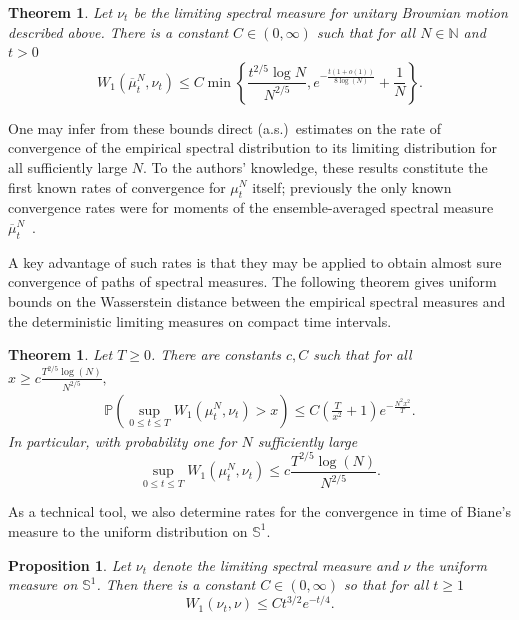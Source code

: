 \documentclass[11pt]{article}
\newtheorem{thm}[theo]{Theorem}
\newtheorem{prop}[theo]{Proposition}
\theoremstyle{definition}
\numberwithin{equation}{section}
\numberwithin{figure}{section}
\numberwithin{table}{section}
\newcommand{\Prob}{\mathbb{P}}
\begin{document}
\begin{thm}\label{T:main-nu-t}
Let $\nu_t$ be the limiting spectral measure for unitary Brownian motion described above. There is a constant $C\in(0,\infty)$ such that for all $N\in\mathbb{N}$ and $t>0$
\[
W_1(\overline{\mu}_t^N,\nu_t)\le C\min\left\{\frac{t^{2/5}\log N}{N^{2/5}},e^{-\frac{t(1+o(1))}{8\log(N)}}+\frac{1}{N}\right\}.
\]
\end{thm} One may infer from these bounds direct (a.s.)~estimates on the rate of convergence of the empirical spectral distribution to its limiting distribution for all sufficiently large $N$. To the authors' knowledge, these results constitute the first known rates of convergence for $\mu_t^N$ itself; previously the only known convergence rates were for moments of the ensemble-averaged spectral measure $\overline{\mu}^N_t$~\cite{CDK2016}.

A key advantage of such rates is that they may be applied to obtain almost sure convergence of paths of spectral measures. The following theorem gives uniform bounds on the Wasserstein distance between the empirical spectral measures and the deterministic limiting measures on compact time intervals.

\begin{thm}\label{T:close-paths}
Let $T\ge 0$. There are constants $c,C$ such that for all $x\ge c\frac{T^{2/5}\log(N)}{N^{2/5}},$
\begin{align*}
\Prob\left(\sup_{0\le t\le
T}W_1(\mu^N_t,\nu_t)>x\right)\le C\left(\frac{T}{x^2}+1\right)e^{-\frac{N^2x^2}{T}}.
\end{align*}
In particular, with probability one for $N$ sufficiently large
\[
\sup_{0\le t\le T}W_1(\mu^N_t,\nu_t)\le c\frac{T^{2/5}\log(N)}{N^{2/5}}.
\]
\end{thm}

As a technical tool, we also determine rates for the convergence in time of Biane's measure to the uniform distribution on $\mathbb{S}^1$.

\begin{prop}\label{T:biane-to-uniform}
Let $\nu_t$ denote the limiting spectral measure and $\nu$ the uniform measure on $\mathbb{S}^1$. Then there is a constant $C\in(0,\infty)$ so that for all $t\ge1$
\[
W_1(\nu_t,\nu)\le Ct^{3/2}e^{-t/4}.
\]
\end{prop}
\end{document}
